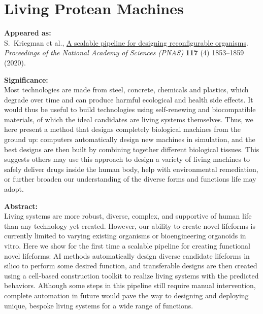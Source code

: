 


\chapter{Living Protean Machines}



\textbf{Appeared as:}\\
S.~Kriegman et al., \href{https://www.pnas.org/content/117/4/1853}{\color{blue}A scalable pipeline for designing reconfigurable organisms}. 
\textit{Proceedings of the National Academy of Sciences (PNAS)} 
\textbf{117} (4) 1853--1859
(2020).

\vspace{1.5em}

\noindent
\textbf{Significance:}\\
\noindent
Most technologies are made from steel, concrete, chemicals and plastics, which degrade over time and can produce harmful ecological and health side effects. It would thus be useful to build technologies using self-renewing and biocompatible materials, of which the ideal candidates are living systems themselves. Thus, we here present a method that designs completely biological machines from the ground up: computers automatically design new machines in simulation, and the best designs are then built by combining together different biological tissues. This suggests others may use this approach to design a variety of living machines to safely deliver drugs inside the human body, help with environmental remediation, or further broaden our understanding of the diverse forms and functions life may adopt.

\vspace{1.5em}

\noindent
\textbf{Abstract:}\\
\noindent
Living systems are more robust, diverse, complex, and supportive of human life than any technology yet created. However, our ability to create novel lifeforms is currently limited to varying existing organisms or bioengineering organoids in vitro. Here we show for the first time a scalable pipeline for creating functional novel lifeforms: AI methods automatically design diverse candidate lifeforms in silico to perform some desired function, and transferable designs are then created using a cell-based construction toolkit to realize living systems with the predicted behaviors. Although some steps in this pipeline still require manual intervention, complete automation in future would pave the way to designing and deploying unique, bespoke living systems for a wide range of functions.



